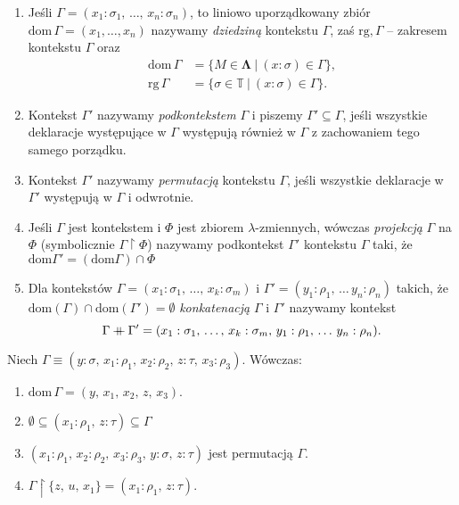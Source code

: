 \begin{definicja}\label{def:context_simple}
  \begin{enumerate}[label=(\arabic*)]
  \setlength\itemsep{0em}
  \item Jeśli \(\Gamma=(x_1:\sigma_1,\,\dots,\,x_n:\sigma_n)\), to liniowo
    uporządkowany zbiór \( \mathrm{dom}\, \Gamma = (x_1,\dots,x_n) \) nazywamy
      \emph{dziedziną} kontekstu \(\Gamma\), zaś \( \mathrm{rg},\Gamma\) -- zakresem kontekstu \(\Gamma\) oraz
      \begin{align*}
        \mathrm{dom}\,\Gamma &= \{M\in\mathbf{\Lambda}\ |\ (x:\sigma) \in \Gamma \},\\
        \mathrm{rg}\,\Gamma &= \{\sigma\in\mathbb{T}\ |\ (x:\sigma) \in \Gamma \}.
      \end{align*}
    \item Kontekst \(\Gamma'\) nazywamy \emph{podkontekstem} \(\Gamma\) i piszemy \(\Gamma'\subseteq\Gamma\), jeśli wszystkie deklaracje występujące w \(\Gamma\) występują również w \(\Gamma\) z zachowaniem tego samego porządku.
    \item Kontekst \(\Gamma'\) nazywamy \emph{permutacją} kontekstu \(\Gamma\), jeśli wszystkie deklaracje w \(\Gamma'\) występują w \(\Gamma\) i odwrotnie.
    \item Jeśli \(\Gamma\) jest kontekstem i \(\Phi\) jest zbiorem \(\lambda\)-zmiennych, wówczas \emph{projekcją} \(\Gamma\) na \(\Phi\) (symbolicznie \(\Gamma \upharpoonright \Phi\)) nazywamy podkontekst \(\Gamma'\) kontekstu \(\Gamma\) taki, że \(\mathrm{dom} \Gamma' = (\mathrm{dom} \Gamma) \cap \Phi\)  
    \item Dla kontekstów \(\Gamma=(x_1:\sigma_1,\,\dots,\,x_k:\sigma_m)\) i \(\Gamma'=(y_1:\rho_1,\,\dots\,y_n:\rho_n)\) takich, że \(\mathrm{dom}(\Gamma)\cap\mathrm{dom}(\Gamma')=\emptyset\) \emph{konkatenacją} \(\Gamma\) i \(\Gamma'\) nazywamy kontekst
      \[
        \Gamma \mathbin{+\mkern-10mu+} \Gamma' = (x_1:\sigma_1,\,\dots,\,x_k:\sigma_m,\,y_1:\rho_1,\,\dots\,y_n:\rho_n).
      \]
  \end{enumerate}
\end{definicja}
\begin{przyklad}
  Niech \(\Gamma\equiv(y:\sigma,\,x_1:\rho_1,\,x_2:\rho_2,\,z:\tau,\,x_3:\rho_3)\). Wówczas:
  \begin{enumerate}[label=(\arabic*)]
    \setlength\itemsep{0em}
    \item \(\mathrm{dom}\,\Gamma=(y,\,x_1,\,x_2,\,z,\,x_3)\).
    \item \(\emptyset \subseteq (x_1:\rho_1,\,z:\tau)\subseteq\Gamma\)
    \item \((x_1:\rho_1,\,x_2:\rho_2,\,x_3:\rho_3,\,y:\sigma,\,z:\tau)\) jest permutacją \(\Gamma\).
    \item \(\Gamma\upharpoonright \{z,\,u,\,x_1\}=(x_1:\rho_1,\,z:\tau).\)
  \end{enumerate}
\end{przyklad}

